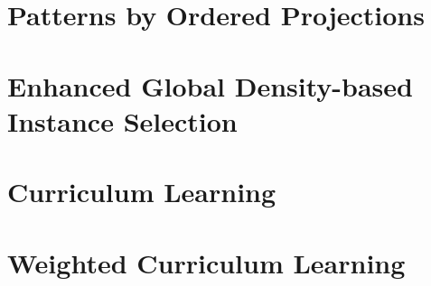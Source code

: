 \section{Patterns by Ordered Projections}
\section{Enhanced Global Density-based Instance Selection}
\section{Curriculum Learning}
\section{Weighted Curriculum Learning}